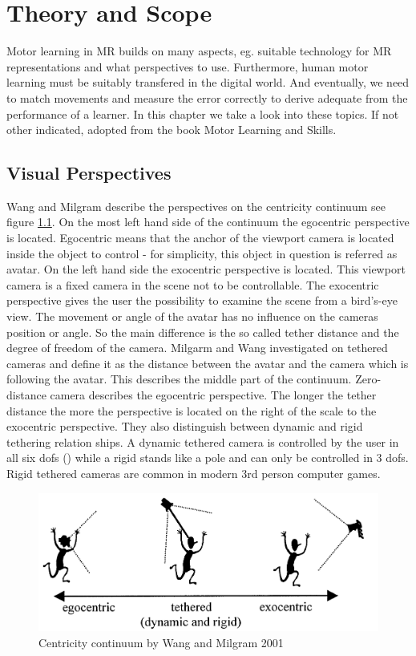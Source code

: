 \chapter{Theory and Scope}

Motor learning in MR builds on many aspects, eg. suitable technology for MR representations and what perspectives to use. Furthermore, human motor learning must be suitably transfered in the digital world. And eventually, we need to match movements and measure the error correctly to derive adequate from the performance of a learner. In this chapter we take a look into these topics. If not other indicated, adopted from the book Motor Learning and Skills\cite{Schmidt2011}.

\section{Visual Perspectives}
\markAoneIndependent
Wang and Milgram \cite{Wang2001} describe the perspectives on the centricity continuum see figure \ref{fig:ego-exo-cont}. On the most left hand side of the continuum the egocentric perspective is located. Egocentric means that the anchor of the viewport camera is located inside the object to control - for simplicity, this object in question is referred as avatar. On the left hand side the exocentric perspective is located. This viewport camera is a fixed camera in the scene not to be controllable. The exocentric perspective gives the user the possibility to examine the scene from a bird's-eye view. The movement or angle of the avatar has no influence on the cameras position or angle. So the main difference is the so called tether distance and the degree of freedom of the camera. Milgarm and Wang investigated on tethered cameras and define it as the distance between the avatar and the camera which is following the avatar. This describes the middle part of the continuum. Zero-distance camera describes the egocentric perspective. The longer the tether distance the more the perspective is located on the right of the scale to the exocentric perspective. They also distinguish between dynamic and rigid tethering relation ships. A dynamic tethered camera is controlled by the user in all six dofs (\todo) while a rigid stands like a pole and can only be controlled in 3 dofs. Rigid tethered cameras are common in modern 3rd person computer games.
\begin{figure}
	\centering
	\includegraphics[width=1.0\textwidth]{img/ego_exo_continuum_bigger.PNG}
	\caption{Centricity continuum by Wang and Milgram 2001 \cite{Wang2001}}
	\label{fig:ego-exo-cont}
\end{figure}
\markAsixPerspective

